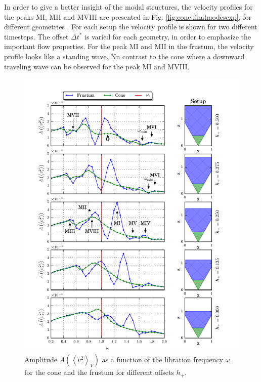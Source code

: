 In order to give a better insight of the modal structures, the velocity profiles for the peaks M\RN{1}, M\RN{2} and M\RN{8}
are presented in Fig. \ref{fig:cone:finalmodesexp}, for different geometries .
For each setup the velocity profile is shown for two different timesteps. The offset $\Delta t^*$ is varied  for each geometry, in order to emphasize
the important flow properties.
For the peak M\RN{1} and M\RN{2} in the frustum, the velocity profile looks like a standing wave.
Nn contrast to the cone where a downward traveling wave can be observed for the peak M\RN{1} and M\RN{8}.


\begin{figure}[!pt]
  \centering
  \includegraphics{gfx/cone/final/transition.pdf}
  \caption{
      \label{fig:cone:finaltransition}Amplitude $A\left(\left<v^2_z\right>_V\right)$ as a function of the libration frequency $\omega$,
      for the cone  and the frustum for different offsets $h_+$.
    }
\end{figure}
\clearpage

